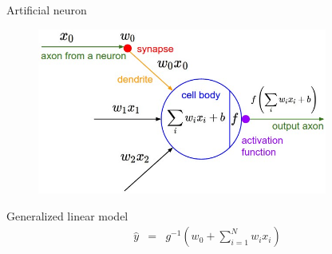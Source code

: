 \documentclass{beamer}
\begin{document}
\begin{frame}{Artificial neuron}

\begin{figure}[h!]
  \centering
  \includegraphics[width=0.85\textwidth]{images/neuron_model.jpeg}
\end{figure}

\begin{block}{Generalized linear model}
\begin{eqnarray*}
\hat{y} &=& g^{-1}\left(w_0 + \sum_{i=1}^N w_i x_i\right)
\end{eqnarray*}
\end{block}
	

\end{frame}
\end{document}
